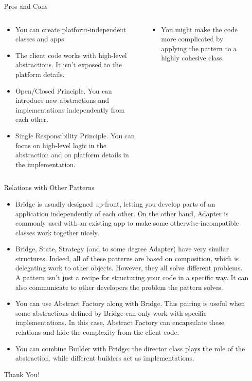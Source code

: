 \documentclass[13pt]{beamer}
\begin{document}
\begin{frame}{Pros and Cons}
	\begin{columns}[T]
		\begin{column}{.5\textwidth}
			\begin{itemize}
				\item You can create platform-independent classes and apps.
				\item The client code works with high-level abstractions. It isn’t exposed to the platform details.
				\item Open/Closed Principle. You can introduce new abstractions and implementations independently from each other.
				\item Single Responsibility Principle. You can focus on high-level logic in the abstraction and on platform details in the implementation.
			\end{itemize}
		\end{column}
	
		\begin{column}{.5\textwidth}
			\begin{itemize}
				\item  You might make the code more complicated by applying the pattern to a highly cohesive class.
			\end{itemize}
		\end{column}
	\end{columns}
\end{frame}

\begin{frame}{Relations with Other Patterns}
	\begin{itemize}
		\item Bridge is usually designed up-front, letting you develop parts of an application independently of each other. On the other hand, Adapter is commonly used with an existing app to make some otherwise-incompatible classes work together nicely.
		\item Bridge, State, Strategy (and to some degree Adapter) have very similar structures. Indeed, all of these patterns are based on composition, which is delegating work to other objects. However, they all solve different problems. A pattern isn’t just a recipe for structuring your code in a specific way. It can also communicate to other developers the problem the pattern solves.
		\item You can use Abstract Factory along with Bridge. This pairing is useful when some abstractions defined by Bridge can only work with specific implementations. In this case, Abstract Factory can encapsulate these relations and hide the complexity from the client code.
		\item You can combine Builder with Bridge: the director class plays the role of the abstraction, while different builders act as implementations.
	\end{itemize}
\end{frame}

\begin{frame}
\begin{center}
{\fontsize{40}{50}\selectfont Thank You!}
\end{center}
\end{frame}
\end{document}
